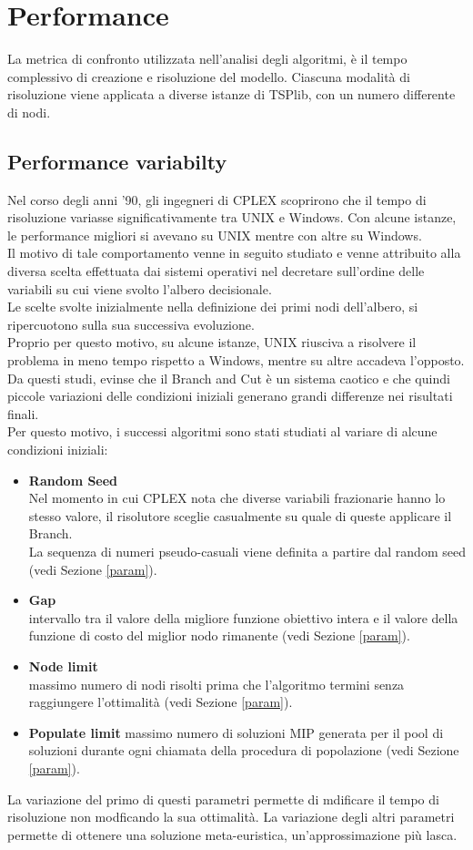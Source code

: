 \chapter{Performance}
La metrica di confronto utilizzata nell'analisi degli algoritmi, è il tempo complessivo di creazione e risoluzione del modello. Ciascuna modalità di risoluzione viene applicata a diverse istanze di TSPlib, con un numero differente di nodi.  
\section{Performance variabilty}
Nel corso degli anni '90, gli ingegneri di CPLEX scoprirono che il tempo di risoluzione variasse significativamente tra UNIX e Windows. Con alcune istanze, le performance migliori si avevano su UNIX mentre con altre su Windows.\\
Il motivo di tale comportamento venne in seguito studiato e venne attribuito alla diversa scelta effettuata dai sistemi operativi nel decretare sull'ordine delle variabili su cui viene svolto l'albero decisionale.\\
Le scelte svolte inizialmente nella definizione dei primi nodi dell'albero, si ripercuotono sulla sua successiva evoluzione.\\
Proprio per questo motivo, su alcune istanze, UNIX riusciva a risolvere il problema in meno tempo rispetto a Windows, mentre su altre accadeva l'opposto.\\
Da questi studi, evinse che il Branch and Cut è un sistema caotico e che quindi piccole variazioni delle condizioni iniziali generano grandi differenze nei risultati finali.\\
Per questo motivo, i successi algoritmi sono stati studiati al variare di alcune condizioni iniziali:
\begin{itemize}
\item{\textbf{Random Seed}\\
Nel momento in cui CPLEX nota che diverse variabili frazionarie hanno lo stesso valore, il risolutore sceglie casualmente su quale di queste applicare il Branch.\\
La sequenza di numeri pseudo-casuali viene definita a partire dal random seed (vedi Sezione \ref{param}).}
\item{\textbf{Gap}\\
intervallo tra il valore della migliore funzione obiettivo intera e il valore della funzione di costo del miglior nodo rimanente (vedi Sezione \ref{param}).}
\item{\textbf{Node limit}\\
massimo numero di nodi risolti prima che l'algoritmo termini senza raggiungere l'ottimalità (vedi Sezione \ref{param}).}
\item{\textbf{Populate limit}
massimo numero di soluzioni MIP generata per il pool di soluzioni durante ogni chiamata della procedura di popolazione (vedi Sezione \ref{param}).}
\end{itemize}
La variazione del primo di questi parametri permette di mdificare il tempo di risoluzione non modficando la sua ottimalità. La variazione degli altri parametri permette di ottenere una soluzione meta-euristica, un'approssimazione più lasca.
 
